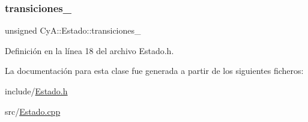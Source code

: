 \mbox{\label{class_cy_a_1_1_estado_ae74acdff6c33550ac3235295d5070b91}} 
\subsubsection{\texorpdfstring{transiciones\+\_\+}{transiciones\_}}
{\footnotesize\ttfamily unsigned Cy\+A\+::\+Estado\+::transiciones\+\_\+}



Definición en la línea 18 del archivo Estado.\+h.



La documentación para esta clase fue generada a partir de los siguientes ficheros\+:\begin{DoxyCompactItemize}
\item 
include/\mbox{\hyperlink{_estado_8h}{Estado.\+h}}\item 
src/\mbox{\hyperlink{_estado_8cpp}{Estado.\+cpp}}\end{DoxyCompactItemize}
